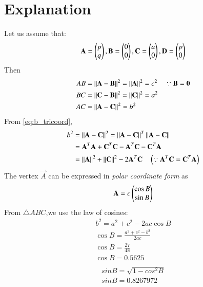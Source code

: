 \documentclass[journal,12pt,twocolumn]{IEEEtran}
\begin{document}
\section{Explanation}
Let us assume that:
\begin{align}
\label{eq:tri_basic}
\mathbf{A} = \begin{pmatrix}p\\q\end{pmatrix}, \mathbf{B} = \begin{pmatrix}0\\0\end{pmatrix}, \mathbf{C} = \begin{pmatrix}a\\0\end{pmatrix}, \mathbf{D} = \begin{pmatrix}p\\0\end{pmatrix}
\end{align}
%
Then
\begin{align}
\label{eq:c_tricoord}
AB &= \left\lVert\mathbf{A}-\mathbf{B}\right\rVert^2 = \left\lVert\mathbf{A}\right\rVert^2  = c^2 \quad \because \mathbf{B} = \mathbf{0}
\\
\label{eq:a_tricoord}
BC &= \left\lVert\mathbf{C}-\mathbf{B}\right\rVert^2 = \left\lVert\mathbf{C}\right\rVert^2  = a^2
\\
AC &= \left\lVert\mathbf{A}-\mathbf{C}\right\rVert^2 =    b^2
\label{eq:b_tricoord}
\end{align}
%
From \eqref{eq:b_tricoord},
\begin{align}
b^2 &=\norm{\vec{A}-\vec{C}}^2 = \norm{\vec{A}-\vec{C}}^T\norm{\vec{A}-\vec{C}}  
\\
&= \vec{A}^T\vec{A}+\vec{C}^T\vec{C}-\vec{A}^T\vec{C} - \vec{C}^T\vec{A} 
\\
&= \norm{\vec{A}}^2 + \norm{\vec{C}}^2 - 2\vec{A}^T\vec{C} \quad \brak{\because \vec{A}^T\vec{C} = \vec{C}^T\vec{A} } 
\label{eq:tri_const_norm_ac}
%
\end{align}
The vertex  $\vec{A}$ can  be expressed  in {\em polar coordinate form} as
\begin{align}
\mathbf{A} = c\begin{pmatrix}\cos B \\  \sin B\end{pmatrix} 
\end{align}
From $\triangle ABC$,we use the law of cosines: 
\begin{align}
b^2 = a^2 + c^2 - 2ac \cos B
\\
\cos B = \frac{a^2+c^2-b^2}{2ac}
\\
\cos B = \frac{27}{48}
\\
\cos B = 0.5625
\\
\end{align}
\begin{align}
sin B = \sqrt{1-cos^2 B}
\\
sin B = 0.8267972
\end{align}
\end{document}
